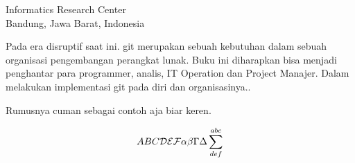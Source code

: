 

{Informatics Research Center\\
Bandung, Jawa Barat, Indonesia}

Pada era disruptif   
saat ini. git merupakan sebuah kebutuhan dalam sebuah organisasi pengembangan perangkat lunak.
Buku ini diharapkan bisa menjadi penghantar para programmer, analis, IT Operation dan Project Manajer.
Dalam melakukan implementasi git pada diri dan organisasinya..

Rumusnya cuman sebagai contoh aja biar keren\cite{awangga2018sampeu}.

\begin{equation}
ABC {\cal DEF} \alpha\beta\Gamma\Delta\sum^{abc}_{def}
\end{equation}
